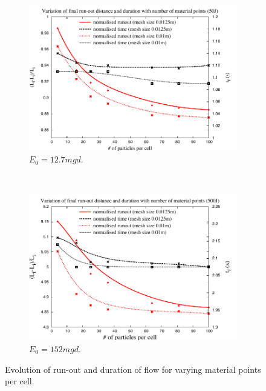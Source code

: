 \begin{figure}[tbhp]
\centering
\begin{subfigure}[b]{0.95\textwidth}
\includegraphics[width=\textwidth]{50}
\caption{$E_0=12.7mgd$.}
\label{fig:50}
\end{subfigure}
\\
\begin{subfigure}[b]{0.95\textwidth}
\centering
\includegraphics[width=\textwidth]{500}
\caption{$E_0=152mgd$.}
\label{fig:500}
\end{subfigure}
\caption{Evolution of run-out and duration of flow  for varying material points 
per cell.}
\label{fig:MPM_Size_Effect}
\end{figure}


